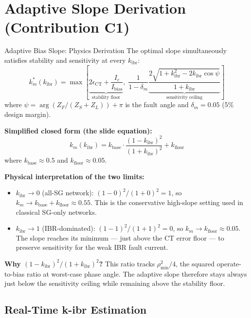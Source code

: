 \documentclass[12pt,a4paper]{article}
\newcommand{\kibr}{k_\mathrm{ibr}}
\newcommand{\km}{k_m}
\newcommand{\kbase}{k_\mathrm{base}}
\newcommand{\kfloor}{k_\mathrm{floor}}
\begin{document}
\section{Adaptive Slope Derivation (Contribution C1)}

\begin{formulabox}{Adaptive Bias Slope: Physics Derivation}
The optimal slope simultaneously satisfies stability and sensitivity at every $\kibr$:
\begin{equation}
  \km^\ast(\kibr) = \max\!\left[
    \underbrace{2\epsilon_\mathrm{CT} + \frac{I_c}{I_\mathrm{bias}}}_{\text{stability floor}},\;
    \frac{1}{1-\delta_m}\underbrace{\frac{2\sqrt{1+\kibr^2-2\kibr\cos\psi}}{1+\kibr}}_{\text{sensitivity ceiling}}
  \right]
  \label{eq:km_optimal}
\end{equation}
where $\psi = \arg(Z_F/(Z_S + Z_L)) + \pi$ is the fault angle and $\delta_m = 0.05$ (5\% design margin).

\textbf{Simplified closed form (the slide equation):}
\begin{equation}
  \km(\kibr) = \kbase \cdot \frac{(1-\kibr)^2}{(1+\kibr)^2} + \kfloor
  \label{eq:km_slide}
\end{equation}
where $\kbase \approx 0.5$ and $\kfloor \approx 0.05$.

\textbf{Physical interpretation of the two limits:}
\begin{itemize}[nosep]
  \item $\kibr \to 0$ (all-SG network): $(1-0)^2/(1+0)^2 = 1$, so $\km \to \kbase + \kfloor \approx 0.55$. This is the conservative high-slope setting used in classical SG-only networks.
  \item $\kibr \to 1$ (IBR-dominated): $(1-1)^2/(1+1)^2 = 0$, so $\km \to \kfloor \approx 0.05$. The slope reaches its minimum --- just above the CT error floor --- to preserve sensitivity for the weak IBR fault current.
\end{itemize}

\textbf{Why $(1-\kibr)^2/(1+\kibr)^2$?} This ratio tracks $\rho_\mathrm{min}^2/4$, the squared operate-to-bias ratio at worst-case phase angle. The adaptive slope therefore stays always just below the sensitivity ceiling while remaining above the stability floor.
\end{formulabox}

\subsection{Real-Time k-ibr Estimation}
\end{document}
